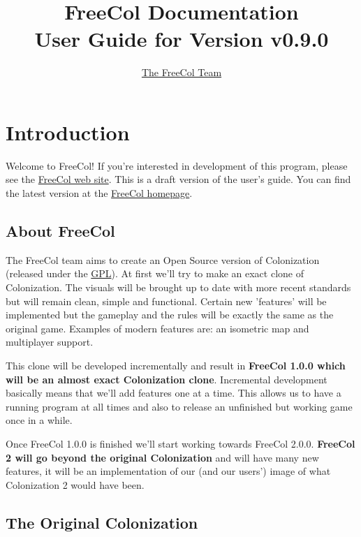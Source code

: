 \documentclass[12pt]{book}
\begin{document}
\author{\href{http://freecol.sourceforge.net/index.php?section=8}{The FreeCol Team}}
\title{FreeCol Documentation\\User Guide for Version v0.9.0}
\maketitle{}

\tableofcontents
\newpage


\hypertarget{Introduction}{\chapter{Introduction}}

Welcome to FreeCol! If you're interested in development of this
program, please see the \href{http://freecol.sourceforge.net}{FreeCol
web site}. This is a draft version of the user's guide. You can find
the latest version at the
\href{http://freecol.sourceforge.net}{FreeCol homepage}.

\hypertarget{About FreeCol}{\section{About FreeCol}}

The FreeCol team aims to create an Open Source version of
Colonization (released under the
\href{http://www.gnu.org/licenses/gpl.html}{GPL}). At
first we'll try to make an exact clone of Colonization. The visuals
will be brought up to date with more recent standards but will remain
clean, simple and functional. Certain new 'features' will be
implemented but the gameplay and the rules will be exactly the same as
the original game. Examples of modern features are: an isometric map
and multiplayer support.

This clone will be developed incrementally and result in
\textbf{FreeCol 1.0.0 which will be an almost exact Colonization
clone}. Incremental development basically means that we'll add
features one at a time. This allows us to have a running program at
all times and also to release an unfinished but working game once in a
while.

Once FreeCol 1.0.0 is finished we'll start working towards FreeCol
2.0.0. \textbf{FreeCol 2 will go beyond the original Colonization} and
will have many new features, it will be an implementation of our (and
our users') image of what Colonization 2 would have been.


\hypertarget{The Original Colonization}{\section{The Original Colonization}}
\end{document}
